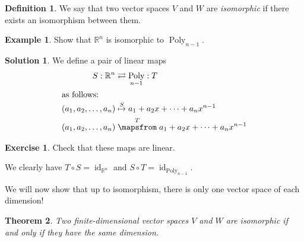 \documentclass[a4paper,11pt]{book}
\newtheorem{theorem}{Theorem}
\theoremstyle{definition}
\newtheorem{definition}[theorem]{Definition}
\newtheorem{exercise}{Exercise}
\newtheorem{example_environment}{Example}[chapter]
\newtheorem*{solution}{Solution}
\newenvironment{example}
	{
		\begin{oframed} 
		\begin{example_environment}
	}
	{
		\end{example_environment}
		\end{oframed}
	}
\DeclareMathOperator{\Poly}{Poly}
\DeclareMathOperator{\id}{id}
\begin{document}
\begin{definition} We say that two vector spaces $V$ and $W$ are {\em isomorphic} if there exists an isomorphism between them.
\end{definition}

\begin{example} Show that $\mathbb{R}^n$ is isomorphic to $\Poly_{n-1}$.
\begin{solution} We define a pair of linear maps
\begin{align*}
 S : \mathbb{R}^n & \rightleftarrows \Poly_{n-1} : T \\
\intertext{as follows:}
 (a_1, a_2, \ldots, a_n) & \stackrel{S}{\mapsto} a_1 + a_2 x + \cdots + a_n x^{n-1} \\
 (a_1, a_2, \ldots, a_n) & \stackrel{T}{\mapsfrom} a_1 + a_2 x + \cdots + a_n x^{n-1} 
\end{align*}
\end{solution}
\begin{exercise} Check that these maps are linear.
\end{exercise}
We clearly have $T \circ S = \id_{\mathbb{R}^n}$ and $S \circ T = \id_{\Poly_{n-1}}$.
\end{example}
We will now show that up to isomorphism, there is only one vector space of each dimension!
\begin{theorem} Two finite-dimensional vector spaces $V$ and $W$ are isomorphic if and only if they have the same dimension.
\end{theorem}
\end{document}
